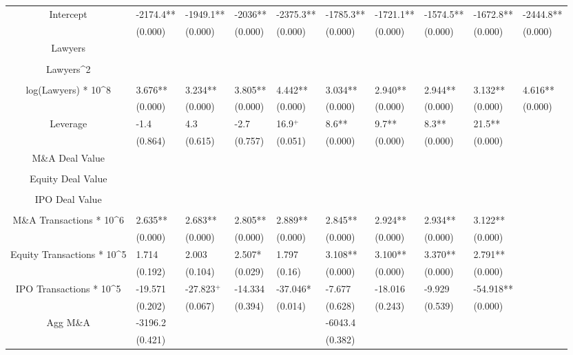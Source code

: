 \documentclass{article}
\begin{document}
\begin{table}[H]
\begin{tabular}{|clllllllll|}
Intercept & -2174.4** & -1949.1** & -2036** & -2375.3** & -1785.3** & -1721.1** & -1574.5** & -1672.8** & -2444.8** \\
   & (0.000) & (0.000) & (0.000) & (0.000) & (0.000) & (0.000) & (0.000) & (0.000) & (0.000) \\
  Lawyers &  &  &  &  &  &  &  &  &  \\
   &  &  &  &  &  &  &  &  &  \\
  Lawyers^2 &  &  &  &  &  &  &  &  &  \\
   &  &  &  &  &  &  &  &  &  \\
  log(Lawyers) * 10^8 & 3.676** & 3.234** & 3.805** & 4.442** & 3.034** & 2.940** & 2.944** & 3.132** & 4.616** \\
   & (0.000) & (0.000) & (0.000) & (0.000) & (0.000) & (0.000) & (0.000) & (0.000) & (0.000) \\
  Leverage & -1.4 & 4.3 & -2.7 & 16.9$^{+}$ & 8.6** & 9.7** & 8.3** & 21.5** &  \\
   & (0.864) & (0.615) & (0.757) & (0.051) & (0.000) & (0.000) & (0.000) & (0.000) &  \\
  M\&A Deal Value &  &  &  &  &  &  &  &  &  \\
   &  &  &  &  &  &  &  &  &  \\
  Equity Deal Value &  &  &  &  &  &  &  &  &  \\
   &  &  &  &  &  &  &  &  &  \\
  IPO Deal Value &  &  &  &  &  &  &  &  &  \\
   &  &  &  &  &  &  &  &  &  \\
  M\&A Transactions * 10^6 & 2.635** & 2.683** & 2.805** & 2.889** & 2.845** & 2.924** & 2.934** & 3.122** &  \\
   & (0.000) & (0.000) & (0.000) & (0.000) & (0.000) & (0.000) & (0.000) & (0.000) &  \\
  Equity Transactions * 10^5 & 1.714 & 2.003 & 2.507* & 1.797 & 3.108** & 3.100** & 3.370** & 2.791** &  \\
   & (0.192) & (0.104) & (0.029) & (0.16) & (0.000) & (0.000) & (0.000) & (0.000) &  \\
  IPO Transactions * 10^5 & -19.571 & -27.823$^{+}$ & -14.334 & -37.046* & -7.677 & -18.016 & -9.929 & -54.918** &  \\
   & (0.202) & (0.067) & (0.394) & (0.014) & (0.628) & (0.243) & (0.539) & (0.000) &  \\
  Agg M\&A & -3196.2 &  &  &  & -6043.4 &  &  &  &  \\
   & (0.421) &  &  &  & (0.382) &  &  &  &  \\

\end{tabular}
\end{table}
\end{document}
